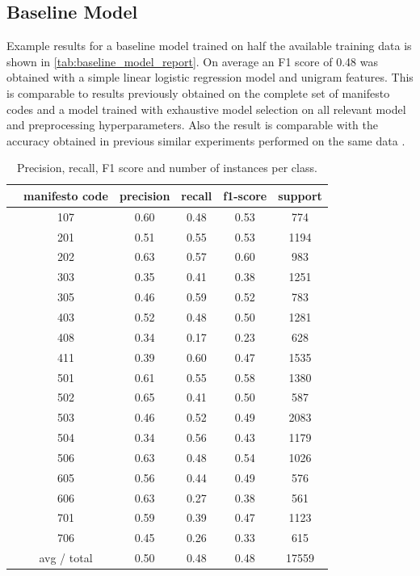 \documentclass[runningheads,a4paper]{article}
\begin{document}
\subsection{Baseline Model}\label{sec:results_baseline}
Example results for a baseline model trained on half the available training data is shown in \autoref{tab:baseline_model_report}. On average an F1 score of 0.48 was obtained with a simple linear logistic regression model and unigram features. This is comparable to results previously obtained on the complete set of manifesto codes and a model trained with exhaustive model selection on all relevant model and preprocessing hyperparameters. Also the result is comparable with the accuracy obtained in previous similar experiments performed on the same data \cite{Merz2016}.
\begin{table}
\centering
\begin{tabular}{cccccc}
\toprule
&  manifesto code & precision  &  recall&  f1-score &  support\\
\midrule
&   107&  0.60& 0.48& 0.53&  774\\
&   201&  0.51& 0.55& 0.53& 1194\\
&   202&  0.63& 0.57& 0.60&  983\\
&   303&  0.35& 0.41& 0.38& 1251\\
&   305&  0.46& 0.59& 0.52&  783\\
&   403&  0.52& 0.48& 0.50& 1281\\
&   408&  0.34& 0.17& 0.23&  628\\
&   411&  0.39& 0.60& 0.47& 1535\\
&   501&  0.61& 0.55& 0.58& 1380\\
&   502&  0.65& 0.41& 0.50&  587\\
&   503&  0.46& 0.52& 0.49& 2083\\
&   504&  0.34& 0.56& 0.43& 1179\\
&   506&  0.63& 0.48& 0.54& 1026\\
&   605&  0.56& 0.44& 0.49&  576\\
&   606&  0.63& 0.27& 0.38&  561\\
&   701&  0.59& 0.39& 0.47& 1123\\
&   706&  0.45& 0.26& 0.33&  615\\
\bottomrule
& avg / total&  0.50& 0.48& 0.48&17559\\
\end{tabular}
\caption{Precision, recall, F1 score and number of instances per class. }
\label{tab:baseline_model_report} 
\end{table}
\end{document}
